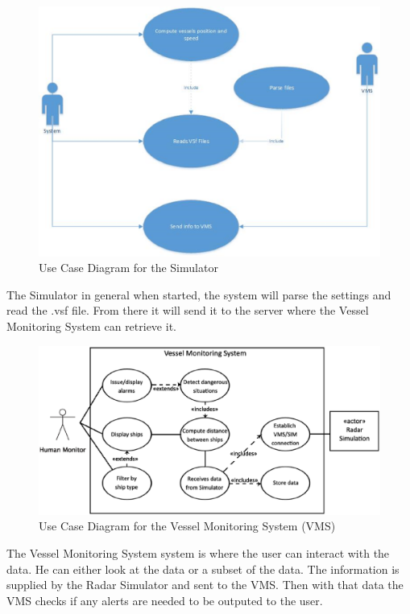 \documentclass{article}
\begin{document}
\begin{figure}[!htb]
\caption{Use Case Diagram for the Simulator}
\includegraphics[scale=0.4]{diagrams/usecasediagram.eps}
\end{figure}
The Simulator in general when started, the system will parse the settings and read the .vsf file. From there it will send it to the server where the Vessel Monitoring System can retrieve it.

\break

\begin{figure}[!htb]
\caption{Use Case Diagram for the Vessel Monitoring System (VMS)}
\centering
\includegraphics[scale=0.32]{diagrams/vmsdiagram.eps}
\end{figure}
The Vessel Monitoring System system is where the user can interact with the data. He can either look at the data or a subset of the data. 
The information is supplied by the Radar Simulator and sent to the VMS.
Then with that data the VMS checks if any alerts are needed to be outputed to the user.
\end{document}
